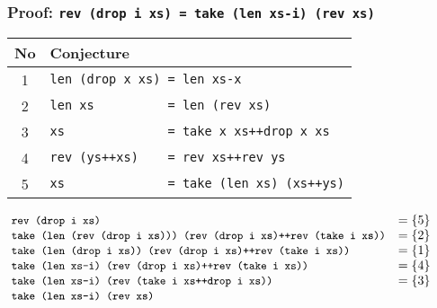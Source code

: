 \documentclass[serif,professionalfont]{beamer}
\newcommand\hs[1]{\texttt{#1}}
\begin{document}
\begin{frame}[fragile]
  \frametitle{Proof: \Large\texttt{rev (drop i xs) = take (len xs-i) (rev xs)}}
  \begin{center}
  \begin{tabular}{>{\small}c >{\small}l}
   No & Conjecture \\
   \hline
  1 & \verb!len (drop x xs) = len xs-x!               \\[-1pt]
  2 & \verb!len xs          = len (rev xs)!           \\[-1pt]
  3 & \verb!xs              = take x xs++drop x xs!   \\[-1pt]
  4 & \verb!rev (ys++xs)    = rev xs++rev ys!         \\[-1pt]
  5 & \verb!xs              = take (len xs) (xs++ys)!
  \end{tabular}
  \end{center}

  \begin{align*}
  & \hspace{-2em} \small \hs{rev (drop i xs)}                                                   & \small = \left\{ 5 \right\} \\[-3pt]
  & \hspace{-2em} \small \hs{take (len (rev (drop i xs))) (rev (drop i xs)++rev (take i xs))}   & \small = \left\{ 2 \right\} \\[-3pt]
  & \hspace{-2em} \small \hs{take (len (drop i xs)) (rev (drop i xs)++rev (take i xs))}         & \small = \left\{ 1 \right\} \\[-3pt]
  & \hspace{-2em} \small \hs{take (len xs-i) (rev (drop i xs)++rev (take i xs))}                & \small = \left\{ 4 \right\} \\[-3pt]
  & \hspace{-2em} \small \hs{take (len xs-i) (rev (take i xs++drop i xs))}                      & \small = \left\{ 3 \right\} \\[-3pt]
  & \hspace{-2em} \small \hs{take (len xs-i) (rev xs)}
  \end{align*}
\end{frame}
\end{document}
